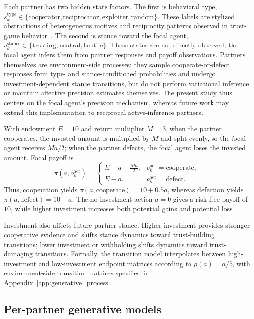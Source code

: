 Each partner has two hidden state factors. The first is behavioral type, \(s_k^{\mathrm{type}} \in \{\mathrm{cooperator},\mathrm{reciprocator},\mathrm{exploiter},\mathrm{random}\}\). These labels are stylized abstractions of heterogeneous motives and reciprocity patterns observed in trust-game behavior~\cite{Espin2016HeterogeneousMotivesTrust,Smith2013ReciprocityTrustGame}. The second is stance toward the focal agent, \(s_k^{\mathrm{stance}} \in \{\mathrm{trusting},\mathrm{neutral},\mathrm{hostile}\}\). These states are not directly observed; the focal agent infers them from partner responses and payoff observations. Partners themselves are environment-side processes: they sample cooperate-or-defect responses from type- and stance-conditioned probabilities and undergo investment-dependent stance transitions, but do not perform variational inference or maintain affective precision estimates themselves. The present study thus centers on the focal agent's precision mechanism, whereas future work may extend this implementation to reciprocal active-inference partners.

With endowment \(E=10\) and return multiplier \(M=3\), when the partner cooperates, the invested amount is multiplied by \(M\) and split evenly, so the focal agent receives \(Ma/2\); when the partner defects, the focal agent loses the invested amount. Focal payoff is
\[
\pi(a,o_k^{\mathrm{act}})=
\begin{cases}
E-a+\frac{Ma}{2}, & o_k^{\mathrm{act}}=\mathrm{cooperate},\\
E-a, & o_k^{\mathrm{act}}=\mathrm{defect}.
\end{cases}
\]
Thus, cooperation yields \(\pi(a,\mathrm{cooperate})=10+0.5a\), whereas defection yields \(\pi(a,\mathrm{defect})=10-a\). The no-investment action \(a=0\) gives a risk-free payoff of \(10\), while higher investment increases both potential gains and potential loss.

Investment also affects future partner stance. Higher investment provides stronger cooperative evidence and shifts stance dynamics toward trust-building transitions; lower investment or withholding shifts dynamics toward trust-damaging transitions. Formally, the transition model interpolates between high-investment and low-investment endpoint matrices according to \(\rho(a)=a/5\), with environment-side transition matrices specified in Appendix~\ref{app:generative_process}.

\subsection{Per-partner generative models}
\label{sec:partner_models}


